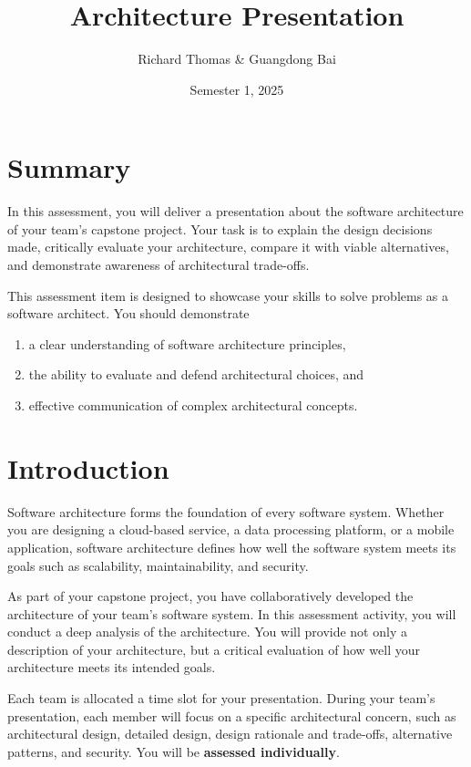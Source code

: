 \documentclass{csse4400}
\title{Architecture Presentation}
\author{Richard Thomas \& Guangdong Bai}
\date{Semester 1, 2025}
\begin{document}

\maketitle

\section*{Summary}

In this assessment, you will deliver a presentation about the software architecture of your team's capstone project.
Your task is to explain the design decisions made, critically evaluate your architecture,
compare it with viable alternatives, and demonstrate awareness of architectural trade-offs.

This assessment item is designed to showcase your skills to solve problems as a software architect. You should demonstrate
\begin{enumerate}[topsep=4pt,partopsep=1pt,itemsep=2pt,parsep=2pt]
    \item a clear understanding of software architecture principles,
    \item the ability to evaluate and defend architectural choices, and
    \item effective communication of complex architectural concepts.
\end{enumerate}


\section{Introduction}

Software architecture forms the foundation of every software system. Whether you are designing a cloud-based service, a data processing platform, or a mobile application, software architecture defines how well the software system meets its goals such as scalability, maintainability, and security.

As part of your capstone project, you have collaboratively developed the architecture of your team's software system.
In this assessment activity, you will conduct a deep analysis of the architecture.
You will provide not only a description of your architecture, but a critical evaluation of how well your architecture meets its intended goals.

Each team is allocated a time slot for your presentation.
During your team's presentation, each member will focus on a specific architectural concern,
such as architectural design, detailed design, design rationale and trade-offs, alternative patterns, and security.
You will be \textbf{assessed individually}.
\end{document}
